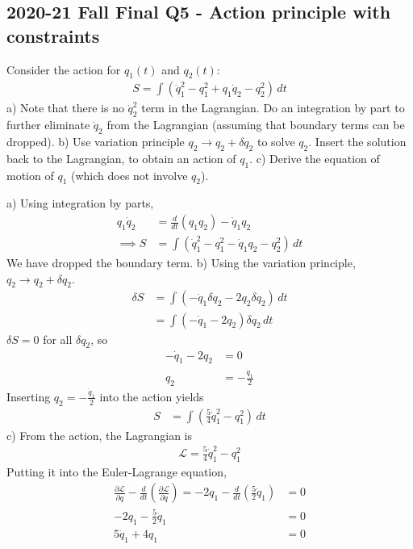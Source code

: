 \documentclass[12pt]{book} %
\numberwithin{equation}{chapter}
\def\d{\delta}
\def\La{\mathcal{L}}
\def\p{\partial}
\begin{document}
\subsection*{2020-21 Fall Final Q5 - Action principle with constraints}
Consider the action for $q_{1}(t)$ and $q_{2}(t)$:
\begin{align*}
S=\int\left(\dot{q}_{1}^{2}-q_{1}^{2}+q_{1}\dot{q}_{2}-q_{2}^{2}\right)\,dt
\end{align*}
a) Note that there is no $\dot{q}_{2}^{2}$ term in the Lagrangian. Do an integration by part to further eliminate $\dot{q}_{2}$ from the Lagrangian (assuming that boundary terms can be dropped).\bigskip\newline
b) Use variation principle $q_{2}\to q_{2}+\d q_{2}$ to solve $q_{2}$. Insert the solution back to the Lagrangian, to obtain an action of $q_{1}$.\bigskip\newline
c) Derive the equation of motion of $q_{1}$ (which does not involve $q_{2}$).

\begin{solbox}
a) Using integration by parts,
\begin{align*}
q_{1}\dot{q}_{2}&=\frac{d}{dt}\left(q_{1}q_{2}\right)-\dot{q}_{1}q_{2}\\
\implies S&=\int\left(\dot{q}_{1}^{2}-q_{1}^{2}-\dot{q}_{1}q_{2}-q_{2}^{2}\right)\,dt
\end{align*}
We have dropped the boundary term.\bigskip\newline
b) Using the variation principle, $q_{2}\to q_{2}+\d q_{2}$.
\begin{align*}
\d S&=\int\left(-\dot{q}_{1}\d q_{2}-2q_{2}\d q_{2}\right)\,dt\\
&=\int \left(-\dot{q}_{1}-2q_{2}\right)\d q_{2}\,dt
\end{align*}
$\d S=0$ for all $\d q_{2}$, so
\begin{align*}
-\dot{q}_{1}-2q_{2}&=0\\
q_{2}&=-\frac{\dot{q}_{1}}{2}
\end{align*}
Inserting $q_{2}=-\frac{\dot{q}_{1}}{2}$ into the action yields
\begin{align*}
S&=\int\left(\frac{5}{4}\dot{q}_{1}^{2}-q_{1}^{2}\right)\,dt
\end{align*}
c) From the action, the Lagrangian is
\begin{align*}
\La=\frac{5}{4}\dot{q}_{1}^{2}-q_{1}^{2}
\end{align*}
Putting it into the Euler-Lagrange equation,
\begin{align*}
\frac{\p \La}{\p q}-\frac{d}{dt}\left(\frac{\p \La}{\p \dot{q}}\right)=-2q_{1}-\frac{d}{dt}\left(\frac{5}{2}\dot{q}_{1}\right)&=0\\
-2q_{1}-\frac{5}{2}\ddot{q}_{1}&=0\\
5\ddot{q}_{1}+4q_{1}&=0
\end{align*}
\end{solbox}
\end{document}

